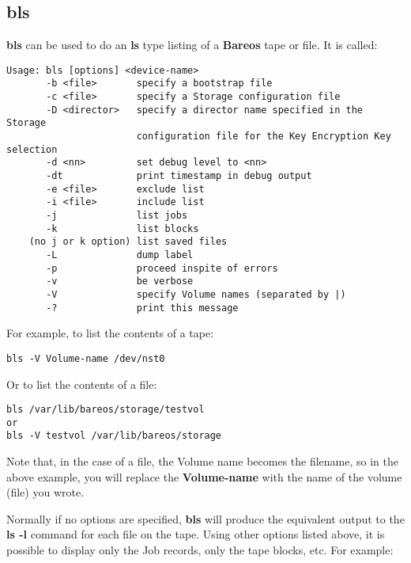 \subsection{bls}
\label{bls}

{\bf bls} can be used to do an {\bf ls} type listing of a {\bf Bareos} tape or
file. It is called:

\footnotesize
\begin{verbatim}
Usage: bls [options] <device-name>
       -b <file>       specify a bootstrap file
       -c <file>       specify a Storage configuration file
       -D <director>   specify a director name specified in the Storage
                       configuration file for the Key Encryption Key selection
       -d <nn>         set debug level to <nn>
       -dt             print timestamp in debug output
       -e <file>       exclude list
       -i <file>       include list
       -j              list jobs
       -k              list blocks
    (no j or k option) list saved files
       -L              dump label
       -p              proceed inspite of errors
       -v              be verbose
       -V              specify Volume names (separated by |)
       -?              print this message
\end{verbatim}
\normalsize

For example, to list the contents of a tape:

\footnotesize
\begin{verbatim}
bls -V Volume-name /dev/nst0
\end{verbatim}
\normalsize

Or to list the contents of a file:

\footnotesize
\begin{verbatim}
bls /var/lib/bareos/storage/testvol
or
bls -V testvol /var/lib/bareos/storage
\end{verbatim}
\normalsize

Note that, in the case of a file, the Volume name becomes the filename, so in
the above example, you will replace the {\bf Volume-name} with the name of the volume
(file) you wrote.

Normally if no options are specified, {\bf bls} will produce the equivalent
output to the {\bf ls -l} command for each file on the tape. Using other
options listed above, it is possible to display only the Job records, only the
tape blocks, etc. For example:

